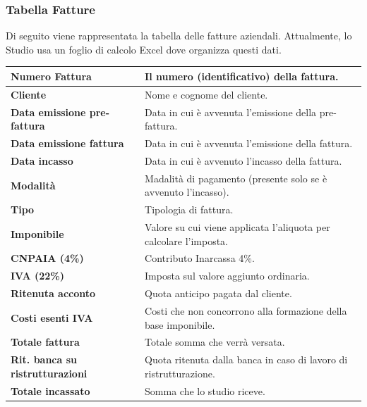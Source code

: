 \documentclass{elegantbook}
\begin{document}
	\subsubsection{Tabella Fatture}
	
	Di seguito viene rappresentata la tabella delle fatture aziendali. Attualmente, lo Studio usa un foglio di calcolo Excel dove organizza questi dati.
	\begin{center}
		\begin{longtable}{|l|p{10cm}|}
			
			\hline
			\textbf{Numero Fattura} & Il numero (identificativo) della fattura. \\
			\hline
			\textbf{Cliente} & Nome e cognome del cliente.\\
			\hline
			\textbf{Data emissione pre-fattura} & Data in cui è avvenuta l'emissione della pre-fattura.\\
			\hline
			\textbf{Data emissione fattura} & Data in cui è avvenuta l'emissione della fattura.\\
			\hline
			\textbf{Data incasso} & Data in cui è avvenuto l'incasso della fattura.\\
			\hline
			\textbf{Modalità} & Madalità di pagamento (presente solo se è avvenuto l'incasso).\\
			\hline
			\textbf{Tipo} & Tipologia di fattura.\\
			\hline 
			\textbf{Imponibile} & Valore su cui viene applicata l'aliquota per calcolare l'imposta.\\
			\hline
			\textbf{CNPAIA (4\%)} & Contributo Inarcassa 4\%.\\
			\hline
			\textbf{IVA (22\%)} &  Imposta sul valore aggiunto ordinaria.\\
			\hline
			\textbf{Ritenuta acconto} & Quota anticipo pagata dal cliente.\\
			\hline
			\textbf{Costi esenti IVA} & Costi che non concorrono alla formazione della base imponibile.\\
			\hline
			\textbf{Totale fattura} & Totale somma che verrà versata.\\
			\hline
			\textbf{Rit. banca su ristrutturazioni} & Quota ritenuta dalla banca in caso di lavoro di ristrutturazione.\\
			\hline
			\textbf{Totale incassato} & Somma che lo studio riceve.\\
			\hline
		\end{longtable}
	\end{center}
	\newpage
\end{document}
